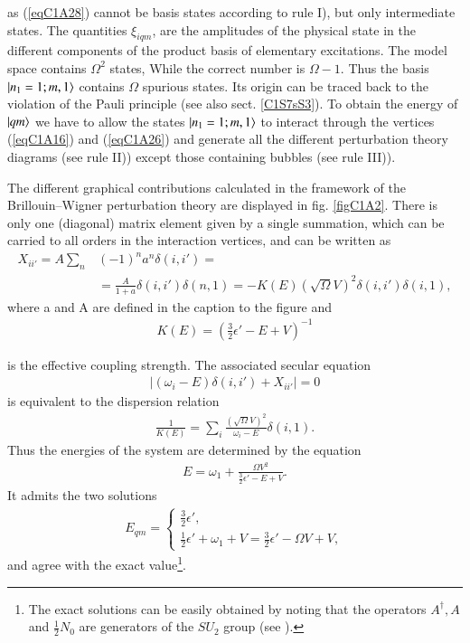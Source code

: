 as (\ref{eqC1A28}) cannot be basis states according to rule I), but only intermediate
states. The quantities $\xi_{iqm}$, are the amplitudes of the physical state in the different components of the product basis of elementary excitations.
The model space contains $\Omega^2$ states, While the correct number is $\Omega-1$.
Thus the basis $|{n_1=1; m,1} \rangle$ contains $\Omega$ spurious states. Its origin can be
traced back to the violation of the Pauli principle (see also sect. \ref{C1S7sS3}).
To obtain the energy of $|{qm} \rangle$ we have to allow the states $|{n_1=1;m,1} \rangle$
to interact through the vertices (\ref{eqC1A16}) and (\ref{eqC1A26}) and generate all the different
perturbation theory diagrams (see rule II)) except those containing bubbles
(see rule III)).


The different graphical contributions calculated in the framework of the
Brillouin--Wigner perturbation theory are displayed in fig. \ref{figC1A2}. There is only
one (diagonal) matrix element given by a single summation, which can be
carried to all orders in the interaction vertices, and can be written as
 \begin{align}\label{eqC1A31} 
X_{ii'}=A\sum_n&(-1)^na^n\delta(i,i')=\\
&=\frac{A}{1+a}\delta(i,i')\delta(n,1)=-K(E)(\sqrt{\Omega}V)^2\delta(i,i')\delta(i,1),
 \end{align}
where a and A are defined in the caption to the figure and
 \begin{align}\label{eqC1A32} 
K(E)=\left(\tfrac{3}{2}\epsilon'-E+V\right)^{-1}
 \end{align}
 
is the effective coupling strength. The associated secular equation
 \begin{align}\label{eqC1A33} 
\left|(\omega_i-E)\delta(i,i')+X_{ii'}\right|=0
 \end{align}
is equivalent to the dispersion relation
 \begin{align}\label{eqC1A34} 
\frac{1}{K(E)}=\sum_i\frac{\left(\sqrt{\Omega}V\right)^2}{\omega_i-E}\delta(i,1).
 \end{align}
Thus the energies of the system are determined by the equation
 \begin{align}\label{eqC1A35} 
E=\omega_1+\frac{\Omega V^2}{\tfrac{3}{2}\epsilon'-E+V}.
 \end{align}
It admits the two solutions
 \begin{align}\label{eqC1A36} 
E_{qm}=\left\{\begin{array}{l}
\frac{3}{2}\epsilon', \\ 
\frac{1}{2}\epsilon'+\omega_1+V=\frac{3}{2}\epsilon'-\Omega V+V,
\end{array} 
\right.
 \end{align}
and agree with the exact value\footnote{The exact solutions can be easily obtained  by noting that the operators $A^\dagger,A$ and $\frac{1}{2}N_0$ are generators of the $SU_2$ group (see \cite{Bortignon:77}).}.



